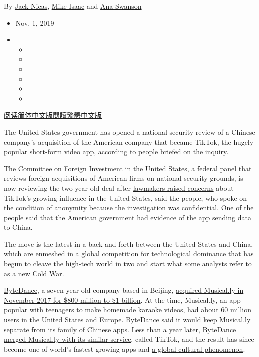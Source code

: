 By \href{https://www.nytimes.com/by/jack-nicas}{Jack Nicas},
\href{https://www.nytimes.com/by/mike-isaac}{Mike Isaac} and
\href{https://www.nytimes.com/by/ana-swanson}{Ana Swanson}

\begin{itemize}
\item
  Nov. 1, 2019
\item
  \begin{itemize}
  \item
  \item
  \item
  \item
  \item
  \item
  \end{itemize}
\end{itemize}

\href{https://cn.nytimes.com/technology/20191104/tiktok-national-security-review/}{阅读简体中文版}\href{https://cn.nytimes.com/technology/20191104/tiktok-national-security-review/zh-hant/}{閱讀繁體中文版}

The United States government has opened a national security review of a
Chinese company's acquisition of the American company that became
TikTok, the hugely popular short-form video app, according to people
briefed on the inquiry.

The Committee on Foreign Investment in the United States, a federal
panel that reviews foreign acquisitions of American firms on
national-security grounds, is now reviewing the two-year-old deal after
\href{https://www.rubio.senate.gov/public/_cache/files/9ba023e4-2f4b-404a-a8c0-e87ea784f440/FCEFFE1F54F3899795B4E5F1F1804630.20191009-letter-to-secretary-mnuchin-re-tiktok.pdf}{lawmakers
raised concerns} about TikTok's growing influence in the United States,
said the people, who spoke on the condition of anonymity because the
investigation was confidential. One of the people said that the American
government had evidence of the app sending data to China.

The move is the latest in a back and forth between the United States and
China, which are enmeshed in a global competition for technological
dominance that has begun to cleave the high-tech world in two and start
what some analysts refer to as a new Cold War.

\href{https://www.nytimes.com/2018/10/29/technology/bytedance-app-funding-china.html}{ByteDance},
a seven-year-old company based in Beijing,
\href{https://www.nytimes.com/2017/11/10/business/dealbook/musically-sold-app-video.html}{acquired
Musical.ly in November 2017 for \$800 million to \$1 billion}. At the
time, Musical.ly, an app popular with teenagers to make homemade karaoke
videos, had about 60 million users in the United States and Europe.
ByteDance said it would keep Musical.ly separate from its family of
Chinese apps. Less than a year later, ByteDance
\href{https://www.theverge.com/2018/8/2/17644260/musically-rebrand-tiktok-bytedance-douyin}{merged
Musical.ly with its similar service}, called TikTok, and the result has
since become one of world's fastest-growing apps and
\href{https://www.nytimes.com/interactive/2019/10/10/arts/TIK-TOK.html}{a
global cultural phenomenon}.


